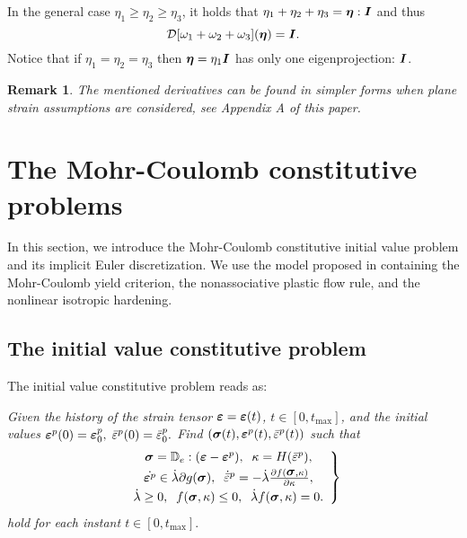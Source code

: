 \documentclass[a4paper,12pt]{article}
\newtheorem{remark}{Remark}[section]
\theoremstyle{remark}
\newcommand{\mbf}[1]{\mbox{\boldmath$#1$}}
\numberwithin{equation}{section}
\begin{document}
In the general case $\eta_1\geq \eta_2\geq \eta_3$, it holds that $\eta_1+\eta_2+\eta_3=\mbf\eta:\mbf I$ and thus
\begin{equation}
\mathcal D[\omega_1+\omega_2+\omega_3](\mbf\eta)=\mbf I.
\label{spectrum_case4}
\end{equation}
Notice that if $\eta_1=\eta_2=\eta_3$ then $\mbf \eta=\eta_1\mbf I$ has only one eigenprojection: $\mbf I$.

\begin{remark}
\emph{The mentioned derivatives can be found in simpler forms when plane strain assumptions are considered, see Appendix A of this paper.}
\end{remark}


\section{The Mohr-Coulomb constitutive problems}
\label{sec_model}

In this section, we introduce the Mohr-Coulomb constitutive initial value problem and its implicit Euler discretization. We use the model proposed in \cite{NPO08} containing the Mohr-Coulomb yield criterion, the  nonassociative plastic flow rule, and the nonlinear isotropic hardening.

\subsection{The initial value constitutive problem}

The initial value constitutive problem reads as:

\medskip\noindent
\textit{Given the history of the strain tensor $\mbf\varepsilon=\mbf\varepsilon(t)$, $t\in[0, t_{\max}]$, and the initial values
$\mbf{\varepsilon}^p(0)=\mbf{\varepsilon}^p_0, \; \bar\varepsilon^p(0)=\bar\varepsilon^p_0.$
Find $(\mbf\sigma(t),\mbf{\varepsilon}^p(t), \bar\varepsilon^p(t))$ such that 
\begin{equation}
\left.
\begin{array}{c}
\mbf\sigma=\mathbb D_e:(\mbf{\varepsilon}-\mbf{\varepsilon}^p),\;\; \kappa=H(\bar\varepsilon^p),\\[1mm]
\dot{\mbf{\varepsilon}^p}\in\dot\lambda\partial g(\mbf\sigma),\;\; \dot{\bar{\varepsilon}}^p=-\dot\lambda\frac{\partial f(\mbf\sigma,\kappa)}{\partial \kappa},\\[1mm]
\dot\lambda\geq0,\;\; f(\mbf\sigma,\kappa)\leq0,\;\; \dot\lambda f(\mbf\sigma,\kappa)=0.
\end{array}
\right\}
\label{CIVP_MC}
\end{equation}
hold for each instant $t\in[0,t_{\max}]$}.
\end{document}
